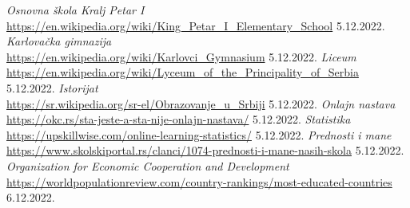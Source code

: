 \documentclass[a4paper]{article}
\begin{document}

\begin{thebibliography}{9}
 \emph{ Osnovna škola Kralj Petar I}\\ 
\url{https://en.wikipedia.org/wiki/King_Petar_I_Elementary_School} 5.12.2022.
 \emph{Karlovačka gimnazija }\\ \url{https://en.wikipedia.org/wiki/Karlovci_Gymnasium} 5.12.2022.
 \emph{Liceum }\\ \url{https://en.wikipedia.org/wiki/Lyceum_of_the_Principality_of_Serbia} 5.12.2022.
 \emph{ Istorijat}\\ \url{https://sr.wikipedia.org/sr-el/Obrazovanje_u_Srbiji} 5.12.2022.
 \emph{Onlajn nastava}\\ \url{https://okc.rs/sta-jeste-a-sta-nije-onlajn-nastava/} 5.12.2022.
 \emph{Statistika}\\ \url{https://upskillwise.com/online-learning-statistics/} 5.12.2022.
 \emph{Prednosti i mane }\\ \url{https://www.skolskiportal.rs/clanci/1074-prednosti-i-mane-nasih-skola} 5.12.2022.
 \emph{Organization for Economic Cooperation and Development }\\ \url{https://worldpopulationreview.com/country-rankings/most-educated-countries} 6.12.2022.
\end{thebibliography}

\appendix
\end{document}

